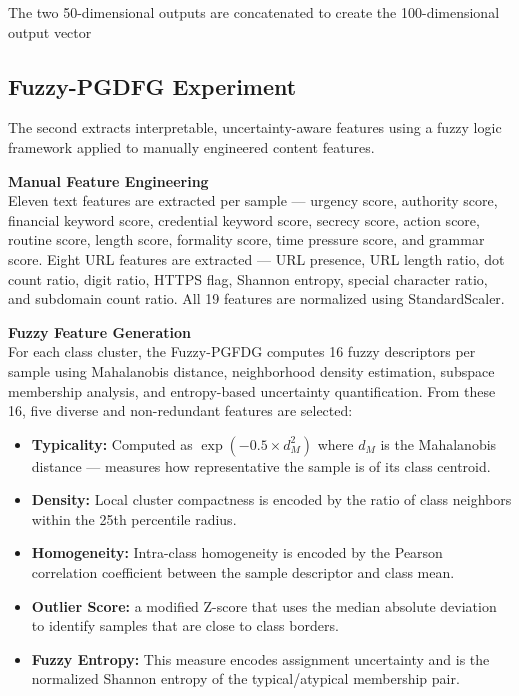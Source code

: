The two 50-dimensional outputs are concatenated to create the 100-dimensional output vector
\subsection{Fuzzy-PGDFG Experiment}
The second extracts interpretable, uncertainty-aware features using a fuzzy logic framework applied to manually engineered content features.

\textbf{Manual Feature Engineering}\\ 
Eleven text features are extracted per sample — urgency score, authority score, financial keyword score, credential keyword score, secrecy score, action score, routine score, length score, formality score, time pressure score, and grammar score. Eight URL features are extracted — URL presence, URL length ratio, dot count ratio, digit ratio, HTTPS flag, Shannon entropy, special character ratio, and subdomain count ratio. All 19 features are normalized using StandardScaler.

\textbf{Fuzzy Feature Generation}\\ 
For each class cluster, the Fuzzy-PGFDG computes 16 fuzzy descriptors per sample using Mahalanobis distance, neighborhood density estimation, subspace membership analysis, and entropy-based uncertainty quantification. From these 16, five diverse and non-redundant features are selected:

\begin{itemize}

\item \textbf{Typicality:} Computed as $\exp(-0.5 \times d_M^2)$ where $d_M$ is the Mahalanobis distance --- measures how representative the sample is of its class centroid.

\item \textbf{Density:} Local cluster compactness is encoded by the ratio of class neighbors within the 25th percentile radius.

\item \textbf{Homogeneity:}  Intra-class homogeneity is encoded by the Pearson correlation coefficient between the sample descriptor and class mean.

\item \textbf{Outlier Score:} a modified Z-score that uses the median absolute deviation to identify samples that are close to class borders.

\item \textbf{Fuzzy Entropy:} This measure encodes assignment uncertainty and is the normalized Shannon entropy of the typical/atypical membership pair.

\end{itemize}

